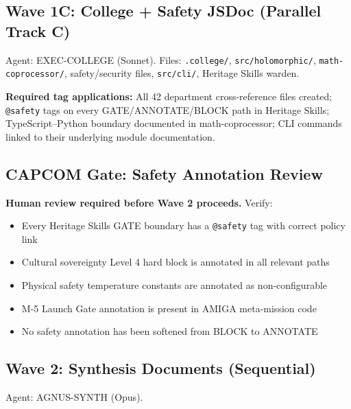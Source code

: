 \documentclass[11pt,letterpaper]{article}
\begin{document}
\subsection{Wave 1C: College + Safety JSDoc (Parallel Track C)}

Agent: EXEC-COLLEGE (Sonnet). Files: \texttt{.college/}, \texttt{src/holomorphic/}, \texttt{math-coprocessor/}, safety/security files, \texttt{src/cli/}, Heritage Skills warden.

\textbf{Required tag applications:} All 42 department cross-reference files created; \texttt{@safety} tags on every GATE/ANNOTATE/BLOCK path in Heritage Skills; TypeScript--Python boundary documented in math-coprocessor; CLI commands linked to their underlying module documentation.

\subsection{CAPCOM Gate: Safety Annotation Review}

\textbf{Human review required before Wave 2 proceeds.} Verify:
\begin{itemize}[noitemsep]
  \item Every Heritage Skills GATE boundary has a \texttt{@safety} tag with correct policy link
  \item Cultural sovereignty Level 4 hard block is annotated in all relevant paths
  \item Physical safety temperature constants are annotated as non-configurable
  \item M-5 Launch Gate annotation is present in AMIGA meta-mission code
  \item No safety annotation has been softened from BLOCK to ANNOTATE
\end{itemize}

\subsection{Wave 2: Synthesis Documents (Sequential)}

Agent: AGNUS-SYNTH (Opus).
\end{document}
